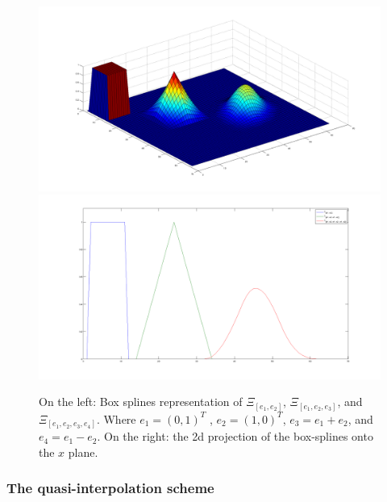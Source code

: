 \documentclass[proc]{edpsmath}
\begin{document}
\begin{figure}[h!]
	\includegraphics[scale=0.15]{figures/boxsplines3d.png}
	\includegraphics[scale=0.15]{figures/boxsplines2d.png}
	\caption{On the left: Box splines representation of $\Xi_[e_1, e_2]$, $\Xi_[e_1, e_2, e_3]$, and $\Xi_[e_1, e_2, e_3, e_4]$. Where $e_1 = ( 0, 1 )^T$ , $e_2 = ( 1, 0)^T$, $e_3 = e_1 + e_2$, and $e_4 = e_1 - e_2$. On the right: the 2d projection of the box-splines onto the $x$ plane.}
	\label{fig:boxsplines3d}
\end{figure}

	


\subsubsection{The quasi-interpolation scheme}
\end{document}
